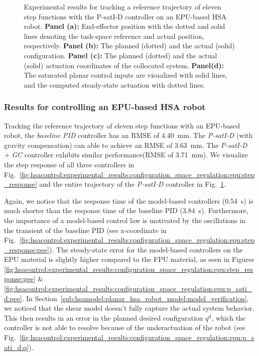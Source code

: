 \begin{figure}[ht]
    \caption{Experimental results for tracking a reference trajectory of eleven step functions with the P-satI-D controller on an EPU-based HSA robot. \textbf{Panel (a):} End-effector position with the dotted and solid lines denoting the task-space reference and actual position, respectively.
    \textbf{Panel (b):} The planned (dotted) and the actual (solid) configuration. 
    \textbf{Panel (c):} The planned (dotted) and the actual (solid) actuation coordinates of the collocated system. 
    \textbf{Panel(d):} The saturated planar control inputs are visualized with solid lines, and the computed steady-state actuation with dotted lines.}\label{fig:hsacontrol:experimental_results:configuration_space_regulation:epu:p_sati_d}
\end{figure}

\subsubsection{Results for controlling an EPU-based HSA robot}
Tracking the reference trajectory of eleven step functions with an EPU-based robot, the \emph{baseline PID} controller has an \gls{RMSE} of \SI{4.40}{mm}. The \emph{P-satI-D} (with gravity compensation) can able to achieve an \gls{RMSE} of \SI{3.63}{mm}. The \emph{P-satI-D + GC} controller exhibits similar performance(\gls{RMSE} of \SI{3.71}{mm}).
We visualize the step response of all three controllers in Fig.~\ref{fig:hsacontrol:experimental_results:configuration_space_regulation:epu:step_response} and the entire trajectory of the \emph{P-satI-D} controller in Fig.~\ref{fig:hsacontrol:experimental_results:configuration_space_regulation:epu:p_sati_d}.

Again, we notice that the response time of the model-based controllers (\SI{0.54}{s}) is much shorter than the response time of the baseline PID (\SI{3.84}{s}). Furthermore, the importance of a model-based control law is motivated by the oscillations in the transient of the baseline PID (see x-coordinate in Fig.~\ref{fig:hsacontrol:experimental_results:configuration_space_regulation:epu:step_response:pee}).
The steady-state error for the model-based controllers on the EPU material is slightly higher compared to the FPU material, as seen in Figures \ref{fig:hsacontrol:experimental_results:configuration_space_regulation:epu:step_response:pee} \& \ref{fig:hsacontrol:experimental_results:configuration_space_regulation:epu:p_sati_d:pee}. In Section~\ref{sub:hsamodel:planar_hsa_robot_model:model_verification}, we noticed that the shear model doesn't fully capture the actual system behavior. This then results in an error in the planned desired configuration $q^\mathrm{d}$, which the controller is not able to resolve because of the underactuation of the robot (see Fig.~\ref{fig:hsacontrol:experimental_results:configuration_space_regulation:epu:p_sati_d:q}).